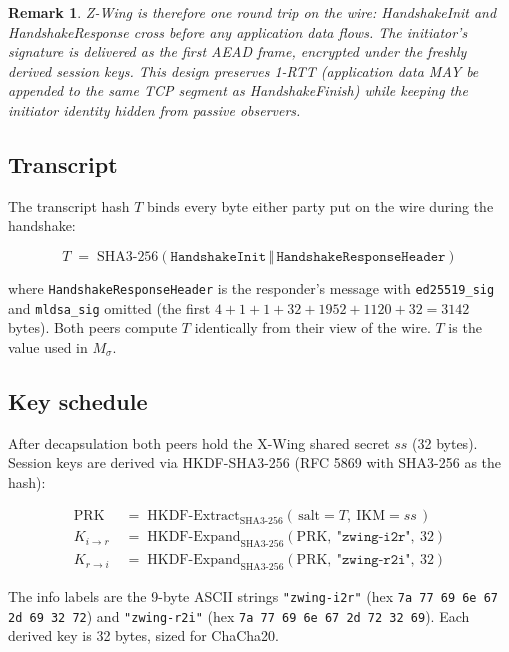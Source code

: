 \documentclass[11pt,a4paper]{article}
\newtheorem{remark}{Remark}
\begin{document}
\begin{remark}
Z-Wing is therefore one round trip on the wire: HandshakeInit and
HandshakeResponse cross before any application data flows. The initiator's
signature is delivered as the first AEAD frame, encrypted under the
freshly derived session keys. This design preserves 1-RTT
(application data MAY be appended to the same TCP segment as
HandshakeFinish) while keeping the initiator identity hidden from
passive observers.
\end{remark}

\subsection{Transcript}

The transcript hash $T$ binds every byte either party put on the wire
during the handshake:

\begin{equation}
T \;=\; \mathrm{SHA3\text{-}256}\!\left( \texttt{HandshakeInit} \,\Vert\, \texttt{HandshakeResponseHeader} \right)
\end{equation}

where \texttt{HandshakeResponseHeader} is the responder's message with
\texttt{ed25519\_sig} and \texttt{mldsa\_sig} omitted (the first
$4 + 1 + 1 + 32 + 1952 + 1120 + 32 = 3142$ bytes). Both peers compute
$T$ identically from their view of the wire. $T$ is the value used in
$M_{\sigma}$.

\subsection{Key schedule}

After decapsulation both peers hold the X-Wing shared secret $ss$
(32 bytes). Session keys are derived via HKDF-SHA3-256 (RFC 5869 with
SHA3-256 as the hash):

\begin{align}
\mathrm{PRK} &\;=\; \mathrm{HKDF\text{-}Extract}_{\mathrm{SHA3\text{-}256}}(\,\mathrm{salt}=T,\ \mathrm{IKM}=ss\,) \\
K_{i\to r}   &\;=\; \mathrm{HKDF\text{-}Expand}_{\mathrm{SHA3\text{-}256}}(\mathrm{PRK},\ \texttt{"zwing-i2r"},\ 32) \\
K_{r\to i}   &\;=\; \mathrm{HKDF\text{-}Expand}_{\mathrm{SHA3\text{-}256}}(\mathrm{PRK},\ \texttt{"zwing-r2i"},\ 32)
\end{align}

The info labels are the 9-byte ASCII strings
\texttt{"zwing-i2r"} (hex \texttt{7a 77 69 6e 67 2d 69 32 72}) and
\texttt{"zwing-r2i"} (hex \texttt{7a 77 69 6e 67 2d 72 32 69}).
Each derived key is 32 bytes, sized for ChaCha20.
\end{document}
